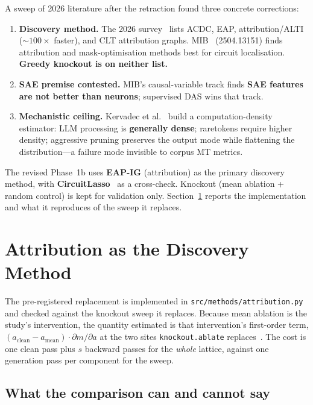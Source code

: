 \documentclass[11pt,a4paper]{article}
\begin{document}
A sweep of 2026 literature after the retraction found three concrete corrections:

\begin{enumerate}
\item \textbf{Discovery method.} The 2026 survey~\cite{survey2026} lists ACDC, EAP,
  attribution/ALTI ($\sim100\times$ faster), and CLT attribution graphs. MIB~\cite{mib}
  (2504.13151) finds attribution and mask-optimisation methods best for circuit
  localisation. \textbf{Greedy knockout is on neither list.}
\item \textbf{SAE premise contested.} MIB's causal-variable track finds \textbf{SAE
  features are not better than neurons}; supervised DAS wins that track.
\item \textbf{Mechanistic ceiling.} Kervadec et al.~\cite{kervadec} build a
  computation-density estimator: LLM processing is \textbf{generally dense}; raretokens
  require higher density; aggressive pruning preserves the output mode while flattening
  the distribution---a failure mode invisible to corpus MT metrics.
\end{enumerate}

The revised Phase~1b uses \textbf{EAP-IG} (attribution) as the primary discovery method,
with \textbf{CircuitLasso}~\cite{circuitlasso} as a cross-check. Knockout (mean ablation +
random control) is kept for validation only. Section~\ref{sec:attribution} reports the
implementation and what it reproduces of the sweep it replaces.

\section{Attribution as the Discovery Method}\label{sec:attribution}

The pre-registered replacement is implemented in \texttt{src/methods/attribution.py}
and checked against the knockout sweep it replaces. Because mean ablation is the
study's intervention, the quantity estimated is that intervention's first-order term,
$(a_{\text{clean}} - a_{\text{mean}}) \cdot \partial m / \partial a$ at the two sites
\texttt{knockout.ablate} replaces~\cite{attributionpatching,syed}. The cost is one clean
pass plus $s$ backward passes for the \emph{whole} lattice, against one generation pass
per component for the sweep.

\subsection{What the comparison can and cannot say}
\end{document}

